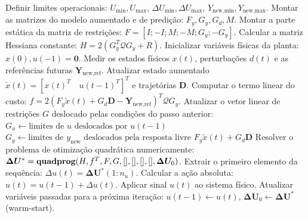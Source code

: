 \documentclass[12pt]{article}
\begin{document}
\begin{algorithm}[H]
\caption{Algoritmo MPC Incremental Com Restrições}
\label{alg:mpc_restrito}
\begin{algorithmic}[1]
\STATE Definir limites operacionais: $U_{\text{min}}, U_{\text{max}}$, $\Delta U_{\text{min}}, \Delta U_{\text{max}}$, $Y_{\text{new,min}}, Y_{\text{new,max}}$.
\STATE Montar as matrizes do modelo aumentado e de predição: $F_y, G_y, G_d, M$.
\STATE Montar a parte estática da matriz de restrições: $F = [I; -I; M; -M; G_y; -G_y]$.
\STATE Calcular a matriz Hessiana constante: $H = 2(G_y^T \mathcal{Q} G_y + R)$.
\STATE Inicializar variáveis físicas da planta: $x(0), u(-1) = \bm{0}$.
\STATE Medir os estados físicos $x(t)$, perturbações $d(t)$ e as referências futuras $\bm{Y}_{\text{new,ref}}$.
\STATE Atualizar estado aumentado $\tilde{x}(t) = [x(t)^T \quad u(t-1)^T]^T$ e trajetórias $\bm{D}$.
\STATE Computar o termo linear do custo: $f = 2(F_y \tilde{x}(t) + G_d \bm{D} - \bm{Y}_{\text{new,ref}})^T \mathcal{Q} G_y$.
\STATE Atualizar o vetor linear de restrições $G$ deslocado pelas condições do passo anterior:
\STATE \quad $G_u \leftarrow \text{limites de } u \text{ deslocados por } u(t-1)$
\STATE \quad $G_y \leftarrow \text{limites de } y_{\text{new}} \text{ deslocados pela resposta livre } F_y \tilde{x}(t) + G_d \bm{D}$
\STATE Resolver o problema de otimização quadrática numericamente:
\STATE \quad $\bm{\Delta U}^* = \text{\bf quadprog}(H, f^T, F, G, [], [], [], [], \bm{\Delta U}_0)$.
\STATE Extrair o primeiro elemento da sequência: $\Delta u(t) = \bm{\Delta U}^*(1:n_u)$.
\STATE Calcular a ação absoluta: $u(t) = u(t-1) + \Delta u(t)$.
\STATE Aplicar sinal $u(t)$ ao sistema físico.
\STATE Atualizar variáveis passadas para a próxima iteração: $u(t-1) \leftarrow u(t)$, $\bm{\Delta U}_0 \leftarrow \bm{\Delta U}^*$ (warm-start).
\end{algorithmic}
\end{algorithm}
\end{document}
